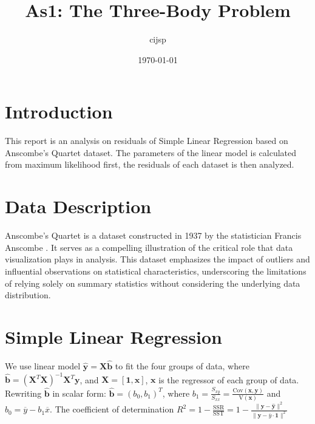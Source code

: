 \documentclass[12pt]{article}
\title{As1: The Three-Body Problem}
\author{cijsp}
\date{\today}
\begin{document}
	
	\maketitle
	
	
	\section{Introduction}

This report is an analysis on residuals of Simple Linear Regression based on Anscombe's Quartet dataset. The parameters of the linear model is calculated from maximum likelihood first, the residuals of each dataset is then analyzed.
	
	
	\section{Data Description}
	
Anscombe's Quartet is a dataset constructed in 1937 by the statistician Francis Anscombe \citep{Anscombe1973}. It serves as a compelling illustration of the critical role that data visualization plays in analysis. This dataset emphasizes the impact of outliers and influential observations on statistical characteristics, underscoring the limitations of relying solely on summary statistics without considering the underlying data distribution.
	
	\section{Simple Linear Regression}

%

	We use linear model 
	$\hat{\mathbf{y}} = \mathbf{X}\hat{\mathbf{b}}$  
	to fit the four groups of data, where 
	$\hat{\mathbf{b}} = (\mathbf{X}^T\mathbf{X})^{-1}\mathbf{X}^T\mathbf{y}$,
	and $\mathbf{X} = [\mathbf{1}, \mathbf{x}]$, $\mathbf{x}$ is the regressor of each group of data. 
	Rewriting $\hat{\mathbf{b}}$ in scalar form: 
	$\hat{\mathbf{b}} = \left( b_0,b_1 \right)^T $,
	where $b_1 = \frac{S_{xy}}{S_{xx}} = \frac{\text{Cov}(\mathbf{x},\mathbf{y})}{\text{V}(\mathbf{x})}$ 
	and $b_0 = \overline{y} - b_1 \overline{x}$. 
	The coefficient of determination $R^2 =1-\frac{\text{SSR}}{\text{SST}} = 1 - \frac{\rVert \mathbf{y} - \hat{\mathbf{y}}\rVert^2}{\rVert \mathbf{y} - \overline{y}\cdot\mathbf{1}\rVert^2} $
\end{document}

